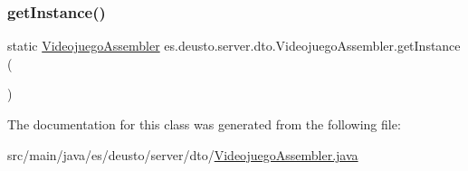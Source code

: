 \mbox{\label{classes_1_1deusto_1_1server_1_1dto_1_1_videojuego_assembler_a979eaf59c9c4d1ccb992485862bdb3ad}} 
\subsubsection{\texorpdfstring{getInstance()}{getInstance()}}
{\footnotesize\ttfamily static \mbox{\hyperlink{classes_1_1deusto_1_1server_1_1dto_1_1_videojuego_assembler}{Videojuego\+Assembler}} es.\+deusto.\+server.\+dto.\+Videojuego\+Assembler.\+get\+Instance (\begin{DoxyParamCaption}{ }\end{DoxyParamCaption})\hspace{0.3cm}{\ttfamily [static]}}



The documentation for this class was generated from the following file\+:\begin{DoxyCompactItemize}
\item 
src/main/java/es/deusto/server/dto/\mbox{\hyperlink{_videojuego_assembler_8java}{Videojuego\+Assembler.\+java}}\end{DoxyCompactItemize}
